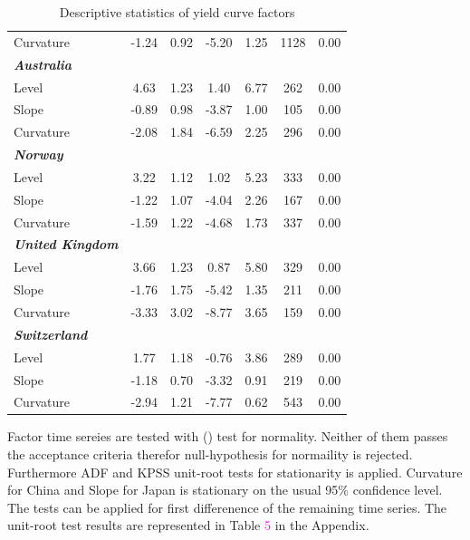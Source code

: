 \documentclass[12pt,bibliography=totoc]{article}
\begin{document}
{\begin{table}[H]
\begin{tabular}{l c c c c c c}
Curvature					&	-1.24	&	0.92	&	-5.20	&	1.25&	1128	&	0.00	\\
\textit{\textbf{Australia}}		&		&		&		&		&		&		\\
Level						&	4.63	&	1.23	&	1.40	&	6.77	&	262	&	0.00	\\
Slope				&	-0.89	&	0.98	&	-3.87	&	1.00	&	105	&	0.00	\\
													
Curvature					&	-2.08	&	1.84	&	-6.59	&	2.25	&	296	&	0.00	\\
\textit{\textbf{Norway}}				&		&		&		&		&		&		\\
Level						&	3.22	&	1.12	&	1.02	&	5.23	&	333	&	0.00	\\
Slope				&	-1.22	&	1.07	&	-4.04	&	2.26	&	167	&	0.00	\\
													
Curvature					&	-1.59	&	1.22	&	-4.68	&	1.73	&	337	&	0.00	\\
\textit{\textbf{United Kingdom}}		&		&		&		&		&		&		\\
Level						&	3.66	&	1.23	&	0.87	&	5.80	&	329	&	0.00	\\
Slope				&	-1.76	&	1.75	&	-5.42	&	1.35	&	211	&	0.00	\\
													
Curvature					&	-3.33	&	3.02	&	-8.77	&	3.65	&	159	&	0.00	\\
\textit{\textbf{Switzerland}}				&		&		&		&		&		&		\\
Level						&	1.77	&	1.18	&	-0.76	&	3.86	&	289	&	0.00	\\
Slope				&	-1.18	&	0.70	&	-3.32	&	0.91	&	219	&	0.00	\\
Curvature					&	-2.94	&	1.21	&	-7.77	&	0.62	&	543	&	0.00	\\

\hline%
\end{tabular}
\label{table:nonlin}%

\caption{Descriptive statistics of yield curve factors}%
\end{table}


\bigskip


Factor time sereies are tested with (\cite{bera1981efficient}) test for normality. Neither of them passes the acceptance criteria therefor null-hypothesis for normaility is rejected. Furthermore ADF and KPSS unit-root tests for stationarity is applied. Curvature for China and Slope for Japan is stationary on the usual 95\% confidence level. The tests can be applied for first differenence of the remaining time series. The unit-root test results are represented in Table \textcolor{magenta}{5} in the Appendix.

}
\end{document}
